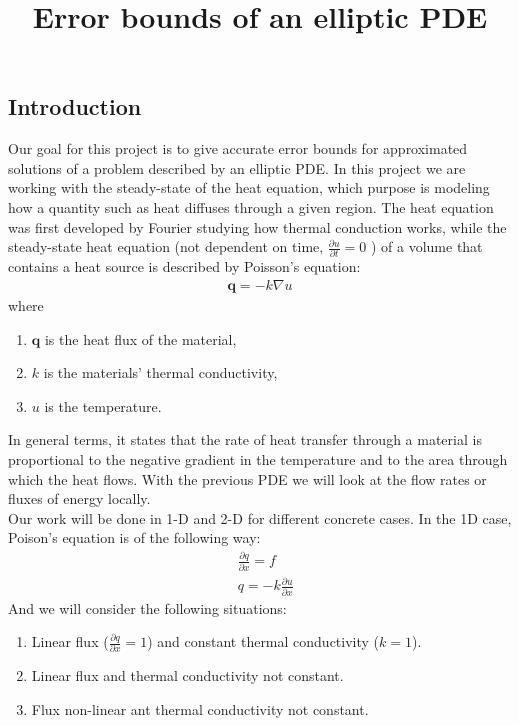 \documentclass{article}
\title{Error bounds of an elliptic PDE}
\date{}
\begin{document}
	\maketitle
	\subsection*{Introduction}
	Our goal for this project is to give accurate error bounds for approximated solutions of a problem described by an elliptic PDE. In this project we are working with the steady-state of the heat equation, which purpose is modeling how a quantity such as heat diffuses through a given region. The heat equation was first developed by Fourier studying how thermal conduction works, while the steady-state heat equation (not dependent on time, $\frac{\partial u}{\partial t} = 0$ ) of a volume that contains a heat source is described by Poisson's equation:
	\begin{align*}
	\bm{q} = -k \nabla u
	\end{align*}
	where 
	\begin{enumerate}
		\item[] $\bm{q}$ is the heat flux of the material,
		\item[] $k$ is the materials' thermal conductivity,
		\item[] $u$ is the temperature.
	\end{enumerate}
	
	In general terms, it states that the rate of heat transfer through a material is proportional to the negative gradient in the temperature and to the area through which the heat flows. With the previous PDE we will look at the flow rates or fluxes of energy locally. \\
	Our work will be done in 1-D and 2-D for different concrete cases. In the 1D case, Poison's equation is of the following way:
	\begin{align*}
	&\frac{\partial q}{\partial x} = f \\
	&q = -k \frac{\partial u}{\partial x} 
	\end{align*}
	And we will consider the following situations:
	\begin{enumerate}
		\item Linear flux ($\frac{\partial q}{\partial x} = 1$) and constant thermal conductivity ($k=1$).
		\item Linear flux and thermal conductivity not constant.
		\item Flux non-linear ant thermal conductivity not constant.
	\end{enumerate}
	
\end{document}
